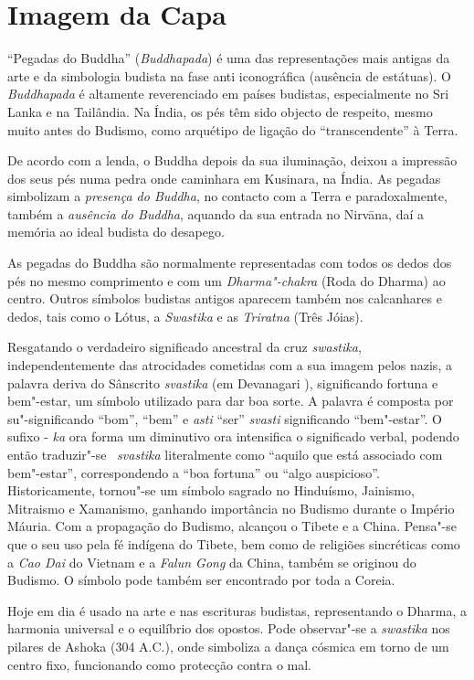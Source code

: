 \chapter{Imagem da Capa}

“Pegadas do Buddha” (\emph{Buddhapada}) é uma das representações mais antigas
da arte e da simbologia budista na fase anti iconográfica (ausência de
estátuas). O \emph{Buddhapada} é altamente reverenciado em países budistas,
especialmente no Sri Lanka e na Tailândia. Na Índia, os pés têm sido objecto de
respeito, mesmo muito antes do Budismo, como arquétipo de ligação do “transcendente”
à Terra.

De acordo com a lenda, o Buddha depois da sua iluminação, deixou a impressão dos
seus pés numa pedra onde caminhara em Kusinara, na Índia. As pegadas simbolizam
a \emph{presença do Buddha}, no contacto com a Terra e paradoxalmente, também a
\emph{ausência do Buddha}, aquando da sua entrada no Nirvāna, daí a memória ao
ideal budista do desapego.

As pegadas do Buddha são normalmente representadas com todos os dedos dos pés no
mesmo comprimento e com um \emph{Dharma"-chakra} (Roda do Dharma) ao
centro. Outros símbolos budistas antigos aparecem também nos calcanhares e
dedos, tais como o Lótus, a \emph{Swastika} e as \emph{Triratna} (Três Jóias).

Resgatando o verdadeiro significado ancestral da cruz \emph{swastika},
independentemente das atrocidades cometidas com a sua imagem pelos nazis, a
palavra deriva do Sânscrito \emph{svastika} (em Devanagari ),
significando fortuna e bem"-estar, um símbolo utilizado para dar boa sorte. A
palavra é composta por su"-significando “bom”, “bem” e \emph{asti} “ser”
\emph{svasti} significando “bem"-estar”. O sufixo - \emph{ka} ora forma um
diminutivo ora intensifica o significado verbal, podendo então
traduzir"-se ~\emph{svastika} literalmente como “aquilo que está associado com bem"-estar”,
correspondendo a “boa fortuna” ou “algo auspicioso”. Historicamente,
tornou"-se um símbolo sagrado no Hinduísmo, Jainismo, Mitraismo e Xamanismo,
ganhando importância no Budismo durante o Império Máuria. Com a propagação do
Budismo, alcançou o Tibete e a China. Pensa"-se que o seu uso pela fé indígena do
Tibete, bem como de religiões sincréticas como a \emph{Cao Dai} do Vietnam e a
\emph{Falun Gong} da China, também se originou do Budismo. O símbolo pode também
ser encontrado por toda a Coreia.

Hoje em dia é usado na arte e nas escrituras budistas, representando o Dharma,
a harmonia universal e o equilíbrio dos opostos. Pode observar"-se
a \emph{swastika} nos pilares de Ashoka (304 A.C.), onde simboliza a dança
cósmica em torno de um centro fixo, funcionando como protecção contra o mal.
